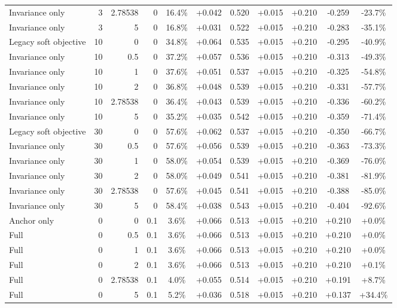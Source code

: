 \begin{table}[htbp]
\begin{tabular}{lrrrccccccc}
Invariance only & 3 & 2.78538 & 0 & 16.4\% & +0.042 & 0.520 & +0.015 & +0.210 & -0.259 & -23.7\% \\
Invariance only & 3 & 5 & 0 & 16.8\% & +0.031 & 0.522 & +0.015 & +0.210 & -0.283 & -35.1\% \\
Legacy soft objective & 10 & 0 & 0 & 34.8\% & +0.064 & 0.535 & +0.015 & +0.210 & -0.295 & -40.9\% \\
Invariance only & 10 & 0.5 & 0 & 37.2\% & +0.057 & 0.536 & +0.015 & +0.210 & -0.313 & -49.3\% \\
Invariance only & 10 & 1 & 0 & 37.6\% & +0.051 & 0.537 & +0.015 & +0.210 & -0.325 & -54.8\% \\
Invariance only & 10 & 2 & 0 & 36.8\% & +0.048 & 0.539 & +0.015 & +0.210 & -0.331 & -57.7\% \\
Invariance only & 10 & 2.78538 & 0 & 36.4\% & +0.043 & 0.539 & +0.015 & +0.210 & -0.336 & -60.2\% \\
Invariance only & 10 & 5 & 0 & 35.2\% & +0.035 & 0.542 & +0.015 & +0.210 & -0.359 & -71.4\% \\
Legacy soft objective & 30 & 0 & 0 & 57.6\% & +0.062 & 0.537 & +0.015 & +0.210 & -0.350 & -66.7\% \\
Invariance only & 30 & 0.5 & 0 & 57.6\% & +0.056 & 0.539 & +0.015 & +0.210 & -0.363 & -73.3\% \\
Invariance only & 30 & 1 & 0 & 58.0\% & +0.054 & 0.539 & +0.015 & +0.210 & -0.369 & -76.0\% \\
Invariance only & 30 & 2 & 0 & 58.0\% & +0.049 & 0.541 & +0.015 & +0.210 & -0.381 & -81.9\% \\
Invariance only & 30 & 2.78538 & 0 & 57.6\% & +0.045 & 0.541 & +0.015 & +0.210 & -0.388 & -85.0\% \\
Invariance only & 30 & 5 & 0 & 58.4\% & +0.038 & 0.543 & +0.015 & +0.210 & -0.404 & -92.6\% \\
Anchor only & 0 & 0 & 0.1 & 3.6\% & +0.066 & 0.513 & +0.015 & +0.210 & +0.210 & +0.0\% \\
Full & 0 & 0.5 & 0.1 & 3.6\% & +0.066 & 0.513 & +0.015 & +0.210 & +0.210 & +0.0\% \\
Full & 0 & 1 & 0.1 & 3.6\% & +0.066 & 0.513 & +0.015 & +0.210 & +0.210 & +0.0\% \\
Full & 0 & 2 & 0.1 & 3.6\% & +0.066 & 0.513 & +0.015 & +0.210 & +0.210 & +0.1\% \\
Full & 0 & 2.78538 & 0.1 & 4.0\% & +0.055 & 0.514 & +0.015 & +0.210 & +0.191 & +8.7\% \\
Full & 0 & 5 & 0.1 & 5.2\% & +0.036 & 0.518 & +0.015 & +0.210 & +0.137 & +34.4\% \\

\end{tabular}
\end{table}
